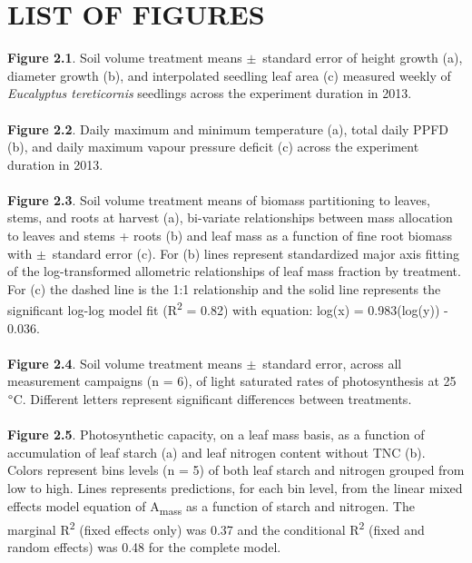 \documentclass[a4paper]{article}
\begin{document}
\clearpage
\section*{LIST OF FIGURES}

\textbf{Figure 2.1}. Soil volume treatment means $\pm$~standard error of height growth (a), diameter growth (b), and interpolated seedling leaf area (c) measured weekly of \textit{Eucalyptus tereticornis} seedlings across the experiment duration in 2013.
\\
\\
\textbf{Figure 2.2}. Daily maximum and minimum temperature (a), total daily PPFD (b), and daily maximum vapour pressure deficit (c) across the experiment duration in 2013.
\\
\\
\textbf{Figure 2.3}. Soil volume treatment means of biomass partitioning to leaves, stems, and roots at harvest (a), bi-variate relationships between mass allocation to leaves and stems + roots (b) and leaf mass as a function of fine root biomass with $\pm$~standard error (c). For (b) lines represent standardized major axis fitting of the log-transformed allometric relationships of leaf mass fraction by treatment. For (c) the dashed line is the 1:1 relationship and the solid line represents the significant log-log model fit (R\textsuperscript{2} = 0.82) with equation: log(x) = 0.983(log(y)) - 0.036.
\\
\\
\textbf{Figure 2.4}. Soil volume treatment means $\pm$~standard error, across all measurement campaigns (n = 6), of light saturated rates of photosynthesis at 25~$\degree$C. Different letters represent significant differences between treatments.
\\
\\
\textbf{Figure 2.5}. Photosynthetic capacity, on a leaf mass basis, as a function of accumulation of leaf starch (a) and leaf nitrogen content without TNC (b). Colors represent bins levels (n = 5) of both leaf starch and nitrogen grouped from low to high.  Lines represents predictions, for each bin level, from the linear mixed effects model equation of A\textsubscript{mass} as a function of starch and nitrogen. The marginal R\textsuperscript{2} (fixed effects only) was 0.37 and the conditional R\textsuperscript{2} (fixed and random effects) was 0.48 for the complete model.
\\
\end{document}
